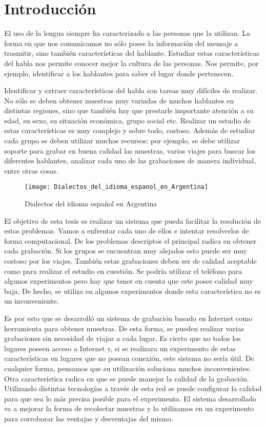 
\chapter{Introducción}

El uso de la lengua siempre ha caracterizado a las personas que la utilizan. La forma en que nos comunicamos no sólo posee la información del mensaje a trasmitir, sino también características del hablante. Estudiar estas características del habla nos permite conocer mejor la cultura de las personas. Nos permite, por ejemplo, identificar a los hablantes para saber el lugar donde pertenecen.

Identificar y extraer características del habla son tareas muy difíciles de realizar. No sólo se deben obtener muestras muy variadas de muchos hablantes en distintas regiones, sino que también hay que prestarle importante atención a su edad, su sexo, su situación económica, grupo social etc. Realizar un estudio de estas características es muy complejo y sobre todo, costoso. Además de estudiar cada grupo se deben utilizar muchos recursos: por ejemplo, se debe utilizar soporte para grabar en buena calidad las muestras, varios viajes para buscar los diferentes hablantes, analizar cada uno de las grabaciones de manera individual, entre otras cosas. 

\begin{figure}[h!]
	\centering
    \texttt{[image: Dialectos\_del\_idioma\_espanol\_en\_Argentina]} 
    \caption{Dialectos del idioma español en Argentina}
    \label{fig11}
\end{figure}

El objetivo de esta tesis es realizar un sistema que pueda facilitar la resolución de estos problemas. Vamos a enfrentar cada uno de ellos e intentar resolverlos de forma computacional. De los problemas descriptos el principal radica en obtener cada grabación. Si los grupos se encuentran muy alejados esto puede ser muy costoso por los viajes. También estas grabaciones deben ser de calidad aceptable como para realizar el estudio en cuestión. Se podría utilizar el teléfono para algunos experimentos pero hay que tener en cuenta que este posee calidad muy baja. De hecho, se utiliza en algunos experimentos donde esta característica no es un inconveniente. 

Es por esto que se desarrolló un sistema de grabación basado en Internet como herramienta para obtener muestras. De esta forma, se pueden realizar varias grabaciones sin necesidad de viajar a cada lugar. Es cierto que no todos los lugares poseen acceso a Internet y, si se realizara un experimento de estas características en lugares que no posean conexión, este sistema no sería útil. De cualquier forma, pensamos que su utilización soluciona muchos inconvenientes. Otra característica radica en que se puede manejar la calidad de la grabación. Utilizando distintas tecnologías a través de esta red se puede configurar la calidad para que sea lo más precisa posible para el experimento. El sistema desarrollado va a mejorar la forma de recolectar muestras y lo utilizamos en un experimento para corroborar las ventajas y desventajas del mismo.

